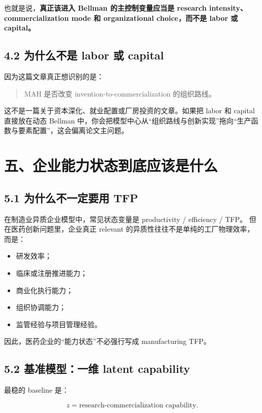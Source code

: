 \documentclass[12pt,fontset=none]{ctexart}
\begin{document}
也就是说，\textbf{真正该进入 Bellman 的主控制变量应当是 research intensity、commercialization mode 和 organizational choice，而不是 labor 或 capital。}

\subsection{4.2 为什么不是 labor 或 capital}

因为这篇文章真正想识别的是：

\begin{quote}
MAH 是否改变 invention-to-commercialization 的组织路线。
\end{quote}

这不是一篇关于资本深化、就业配置或厂房投资的文章。如果把 labor 和 capital 直接放在动态 Bellman 中，你会把模型中心从“组织路线与创新实现”拖向“生产函数与要素配置”，这会偏离论文主问题。

\section{五、企业能力状态到底应该是什么}

\subsection{5.1 为什么不一定要用 TFP}

在制造业异质企业模型中，常见状态变量是 productivity / efficiency / TFP。
但在医药创新问题里，企业真正 relevant 的异质性往往不是单纯的工厂物理效率，而是：

\begin{itemize}[leftmargin=2em]
    \item 研发效率；
    \item 临床或注册推进能力；
    \item 商业化执行能力；
    \item 组织协调能力；
    \item 监管经验与项目管理经验。
\end{itemize}

因此，医药企业的“能力状态”不必强行写成 manufacturing TFP。

\subsection{5.2 基准模型：一维 latent capability}

最稳的 baseline 是：

\[
z=\text{research-commercialization capability}.
\]
\end{document}
